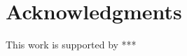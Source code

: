 \documentclass{sig-alternate}
\begin{document}

\section{Acknowledgments}
This work is supported by ***


%

%
%
\end{document}
